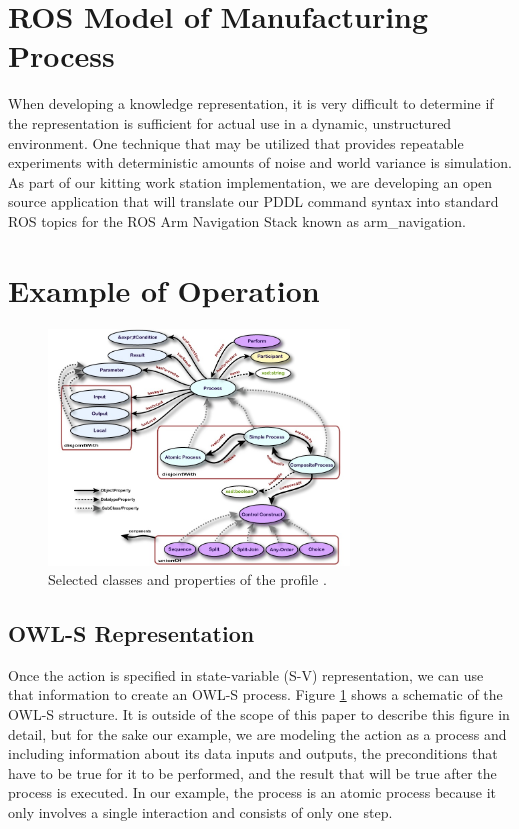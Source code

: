 \documentclass[a4paper, 10pt, conference]{ieeeconf}      %
\begin{document}
\section{ROS Model of Manufacturing Process}
\label{sect:ROS}
When developing a knowledge representation, it is very difficult to determine if the representation is sufficient for actual use in a dynamic, unstructured environment.
One technique that may be utilized that provides repeatable experiments with deterministic amounts of noise and world variance is simulation. As part of our kitting work
station implementation, we are developing an open source application that will translate our PDDL command syntax into standard ROS topics for the ROS Arm Navigation
Stack known as arm\_navigation.

\section{Example of Operation}
\label{sect:Example}
\begin{figure}[htb]
\includegraphics[width=8cm]{images/OWL-S.jpg}
\caption{Selected classes and properties of the profile \cite{OWL-S}.}
\label{fig:OWL-S}
\end{figure}
\subsection{OWL-S Representation}
Once the action is specified in state-variable (S-V) representation, we can use that information to create an OWL-S process. Figure \ref{fig:OWL-S} shows a schematic of the OWL-S structure. It is outside of the scope of this paper to describe this figure in detail, but for the sake our example, we are modeling the action as a process and including information about its data inputs and outputs, the preconditions that have to be true for it to be performed, and the result that will be true after the process is executed. In our example, the process is an atomic process because it only involves a single interaction and consists of only one step.
\end{document}
